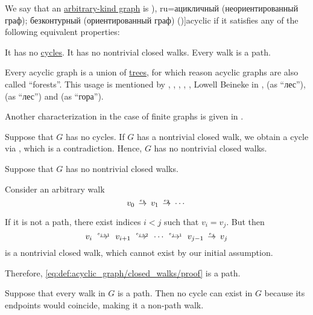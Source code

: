 \begin{definition}\label{def:acyclic_graph}
  We say that an \hyperref[rem:arbitrary_kind_graph]{arbitrary-kind graph} is \term[bg=ацикличен (ориентиран граф) (\cite[14]{Мирчев2001}), ru=ацикличный (неориентированный граф); безконтурный (ориентированный граф) (\cite[280]{БелоусовТкачёв2004})]{acyclic} if it satisfies any of the following equivalent properties:
  \begin{thmenum}
     It has no \hyperref[def:graph_cycle]{cycles}.
     It has no nontrivial closed walks.
     Every walk is a path.
  \end{thmenum}
\end{definition}
\begin{comments}
  \item Every acyclic graph is a union of \hyperref[def:tree]{trees}, for which reason acyclic graphs are also called \enquote{forests}. This usage is mentioned by , , , , , Lowell Beineke in \cite[550]{Rosen1999},  (as \enquote{лес}),  (as \enquote{лес}) and  (as \enquote{гора}).

  \item Another characterization in the case of finite graphs is given in .
\end{comments}
\begin{defproof}
   Suppose that \( G \) has no cycles. If \( G \) has a nontrivial closed walk, we obtain a cycle via , which is a contradiction. Hence, \( G \) has no nontrivial closed walks.

   Suppose that \( G \) has no nontrivial closed walks.

  Consider an arbitrary walk
  \begin{equation}\label{eq:def:acyclic_graph/closed_walks/proof}
    v_0 \reloset {e_1} \to v_1 \reloset {e_2} \to \cdots
  \end{equation}

  If it is not a path, there exist indices \( i < j \) such that \( v_i = v_j \). But then
  \begin{equation*}
    v_i \reloset {e_{i+1}} \to v_{i+1} \reloset {e_{i+2}} \to \cdots \reloset {e_{j-1}} \to v_{j-1} \reloset {e_j} \to v_j
  \end{equation*}
  is a nontrivial closed walk, which cannot exist by our initial assumption.

  Therefore, \eqref{eq:def:acyclic_graph/closed_walks/proof} is a path.

   Suppose that every walk in \( G \) is a path. Then no cycle can exist in \( G \) because its endpoints would coincide, making it a non-path walk.
\end{defproof}

